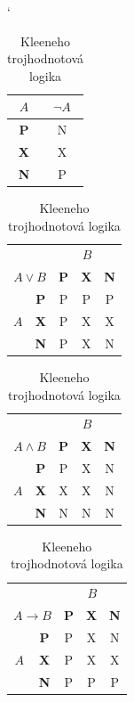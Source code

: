 \documentclass[11pt,a4paper]{article}
\begin{document}
\begin{table}[ht]
	\begin{center}	
	\catcode`
	\begin{tabular}{| c | c |} \hline 
		$A$ & $\neg A$ \\ \hline
		\textbf{P} & N \\ \hline
		\textbf{X} & X \\ \hline
		\textbf{N} & P \\ \hline
	\end{tabular}
	\begin{tabular}{| c | c | c | c | c |} \hline 
		\multicolumn{2}{|c|}{} &\multicolumn{3}{|c|}{$B$} \\ \cline{3-5}
		\multicolumn{2}{|c|}{$A\vee B$} & \textbf{P} & \textbf{X} & \textbf{N}  \\ \hline
		&\textbf{P} & P & P & P \\ \cline{2-5}
		$A$& \textbf{X} & P & X & X \\ \cline{2-5}
		&\textbf{N} & P & X & N \\ \hline
	\end{tabular}
	\begin{tabular}{| c | c | c | c | c |} \hline 
		\multicolumn{2}{|c|}{} &\multicolumn{3}{|c|}{$B$} \\ \cline{3-5}
		\multicolumn{2}{|c|}{$A\wedge B$} & \textbf{P} & \textbf{X} & \textbf{N}  \\ \hline
		&\textbf{P} & P & X & N \\ \cline{2-5}
		$A$& \textbf{X} & X & X & N \\ \cline{2-5}
		&\textbf{N} & N & N & N \\ \hline
	\end{tabular}
	\begin{tabular}{| c | c | c | c | c |} \hline 
		\multicolumn{2}{|c|}{} &\multicolumn{3}{|c|}{$B$} \\ \cline{3-5}
		\multicolumn{2}{|c|}{$A\rightarrow B$} & \textbf{P} & \textbf{X} & \textbf{N}  \\ \hline
		&\textbf{P} & P & X & N \\ \cline{2-5}
		$A$& \textbf{X} & P & X & X \\ \cline{2-5}
		&\textbf{N} & P & P & P \\ \hline
	\end{tabular}
	\caption{Kleeneho trojhodnotová logika}
	\label{tab:2}
	\end{center}
\end{table}
\end{document}
